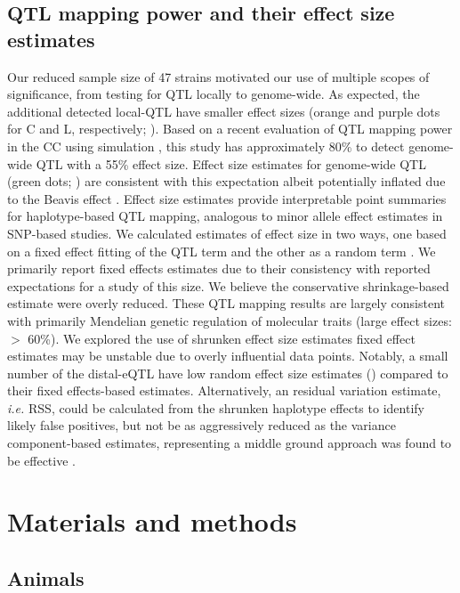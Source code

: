 \documentclass[10pt,letterpaper]{article}
\newcommand{\ie}{\emph{i.e.}\xspace}
\begin{document}
\subsection*{QTL mapping power and their effect size estimates}
Our reduced sample size of 47 strains motivated our use of multiple scopes of significance, from testing for QTL locally to genome-wide. As expected, the additional detected local-QTL have smaller effect sizes (orange and purple dots for C and L, respectively; ). Based on a recent evaluation of QTL mapping power in the CC using simulation \cite{Keele2019}, this study has approximately 80\% to detect genome-wide QTL with a 55\% effect size. Effect size estimates for genome-wide QTL (green dots; ) are consistent with this expectation albeit potentially inflated due to the Beavis effect \cite{Xu2003}. 
Effect size estimates provide interpretable point summaries for haplotype-based QTL mapping, analogous to minor allele effect estimates in SNP-based studies. We calculated estimates of effect size in two ways, one based on a fixed effect fitting of the QTL term and the other as a random term \cite{Wei2016}. 
We primarily report fixed effects estimates due to their consistency with reported expectations \cite{Keele2019} for a study of this size. We believe the conservative shrinkage-based estimate were overly reduced. These QTL mapping results are largely consistent with primarily Mendelian genetic regulation of molecular traits (large effect sizes: $>$ 60\%).
We explored the use of shrunken effect size estimates fixed effect estimates may be unstable due to overly influential data points. Notably, a small number of the distal-eQTL have low random effect size estimates () compared to their fixed effects-based estimates. Alternatively, an residual variation estimate, \ie RSS, could be calculated from the shrunken haplotype effects to identify likely false positives, but not be as aggressively reduced as the variance component-based estimates, representing a middle ground approach was found to be effective \cite{Keele2018}.

\section*{Materials and methods}

\subsection*{Animals}
\end{document}
